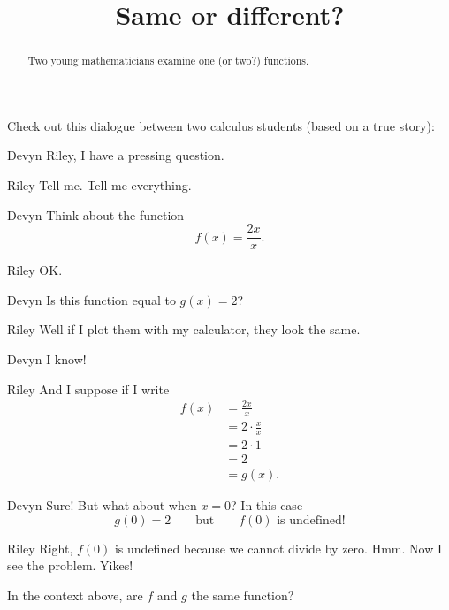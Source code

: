 \documentclass{ximera}
\title[Break-Ground:]{Same or different?}
\begin{document}
\begin{abstract}
  Two young mathematicians examine one (or two?)  functions.
\end{abstract}
\maketitle

Check out this dialogue between two calculus students (based on a true
story):

\begin{dialogue}
\item[Devyn] Riley, I have a pressing question.
\item[Riley] Tell me. Tell me everything.
\item[Devyn] Think about the function
  \[
  f(x) = \frac{2x}{x}.
  \]
\item[Riley] OK.
\item[Devyn] Is this function equal to $g(x) = 2$?
\item[Riley] Well if I plot them with my calculator, they look the
  same.
\item[Devyn] I know!
\item[Riley] And I suppose if I write
  \begin{align*}
    f(x) &= \frac{2x}{x} \\
    &= 2 \cdot \frac{x}{x} \\
    &= 2 \cdot 1 \\
    &= 2 \\
    &= g(x).
  \end{align*}
\item[Devyn] Sure! But what about when $x=0$? In this case
  \[
  g(0) = 2\qquad\text{but}\qquad f(0) \text{ is undefined!}
  \]
\item[Riley] Right, $f(0)$ is undefined because we cannot divide by
  zero. Hmm. Now I see the problem. Yikes!
\end{dialogue}

\begin{problem}
  In the context above, are $f$ and $g$ the same function?
  \begin{multipleChoice}
  \end{multipleChoice}
\end{problem}
\end{document}
